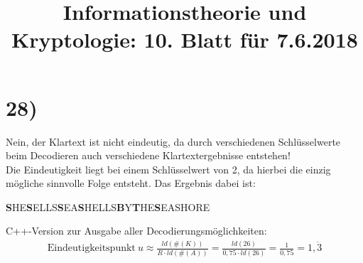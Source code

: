 %



  \title{Informationstheorie und Kryptologie: 10. Blatt für 7.6.2018}
  \maketitle

  \section*{28)}

    Nein, der Klartext ist nicht eindeutig, da durch verschiedenen Schlüsselwerte beim Decodieren auch verschiedene Klartextergebnisse entstehen!\\
    \newline
    Die Eindeutigkeit liegt bei einem Schlüsselwert von 2, da hierbei die einzig mögliche sinnvolle Folge entsteht. Das Ergebnis dabei ist:
    \begin{center}
    	\textbf{S}HE\textbf{S}ELLS\textbf{S}EA\textbf{S}HELLS\textbf{B}Y\textbf{T}HE\textbf{S}EASHORE
    \end{center}
    C++-Version zur Ausgabe aller Decodierungsmöglichkeiten:\\
    

  \begin{align*}
    \text{Eindeutigkeitspunkt}\ u \approx \frac{ld(\#(K))}{R \cdot ld(\#(A))} = \frac{ld(26)}{0,75 \cdot ld(26)} = \frac{1}{0,75} = 1,\dot{3}
  \end{align*}

